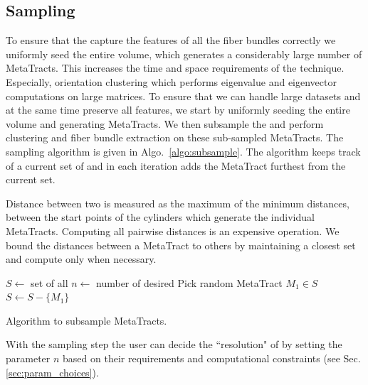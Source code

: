 \subsection {Sampling \mt}\label{subsec:sampling_mt}
To ensure that the \mt capture the features of all the fiber bundles correctly we uniformly seed the entire volume, which generates a considerably large number of MetaTracts. This increases the time and space requirements of the technique. Especially, orientation clustering which performs eigenvalue and eigenvector computations on large matrices. To ensure that we can handle large datasets and at the same time preserve all features, we start by uniformly seeding the entire volume and generating MetaTracts. We then subsample the \mt and  perform clustering and fiber bundle extraction on these sub-sampled MetaTracts.
The sampling algorithm is given in Algo.~\ref{algo:subsample}. The algorithm  keeps track of a current set of \mt and in each iteration adds the MetaTract furthest from the current set.

Distance between two \mt is measured as the maximum of the minimum distances, between the start points of the cylinders which generate the individual MetaTracts. Computing all pairwise distances is an expensive operation. We bound the distances between a MetaTract to others by maintaining a closest set and compute only when necessary.
\begin{algorithm}[tb]
	$S \leftarrow$ set of all \mt\;
	$n \leftarrow$ number of desired \mt\;
	Pick random MetaTract $M_1 \in S$\;
	$S \leftarrow S -\{M_1\}$\;
	\caption{Algorithm to subsample MetaTracts.}
	\label{algo:subsample}
\end{algorithm}
With the sampling step the user can decide the ``resolution" of \mt by setting the parameter $n$ based on their requirements and computational constraints (see Sec.\ref{sec:param_choices}).
